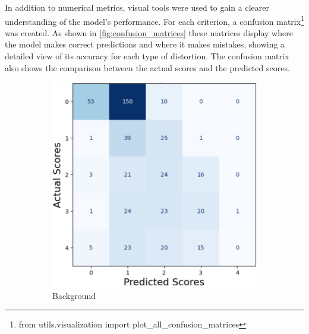 \vspace{\baselineskip}
\noindent
In addition to numerical metrics, visual tools were used to gain a clearer understanding of the model’s performance. For each criterion, a confusion matrix\footnote{from utils.visualization import plot\_all\_confusion\_matrices} was created. As shown in \autoref{fig:confusion_matrices} these matrices display where the model makes correct predictions and where it makes mistakes, showing a detailed view of its accuracy for each type of distortion. The confusion matrix also shows the comparison between the actual scores and the predicted scores. \par
\begin{figure}[ht]
    \centering
    \begin{subfigure}[b]{0.32\textwidth}
        \includegraphics[width=\textwidth]{img/cm/bg.png}
        \caption{Background}
        \label{fig:cm_bg}
    \end{subfigure}
    \hfill
    \begin{subfigure}[b]{0.32\textwidth}

\end{subfigure}
\end{figure}
